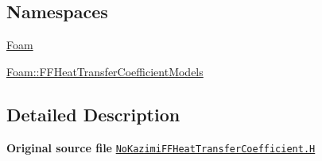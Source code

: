 \subsection*{Namespaces}
\begin{DoxyCompactItemize}
\item 
 \hyperlink{namespaceFoam}{Foam}
\item 
 \hyperlink{namespaceFoam_1_1FFHeatTransferCoefficientModels}{Foam\+::\+F\+F\+Heat\+Transfer\+Coefficient\+Models}
\end{DoxyCompactItemize}


\subsection{Detailed Description}
{\bfseries Original source file} \href{../../../home/carlo/data/GeN-Foam/GeN-Foam_ffn/GeN-Foam/GeN-Foam/classes/thermalHydraulics/src/physicsModels/heatTransferModels/FFHeatTransferCoefficientModels/NoKazimi/NoKazimiFFHeatTransferCoefficient.H}{\tt No\+Kazimi\+F\+F\+Heat\+Transfer\+Coefficient.\+H} 